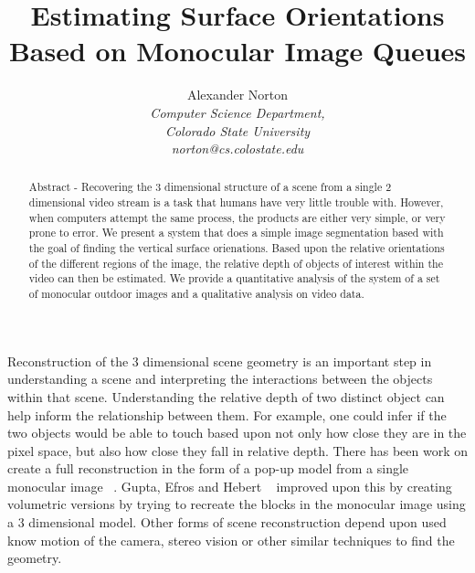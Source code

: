 \documentclass[times,10pt,twocolumn]{article}
\begin{document}
\title{Estimating Surface Orientations Based on Monocular Image Queues}

\author{Alexander Norton\\
\emph{Computer Science Department,}\\
\emph{Colorado State University}\\
\emph{norton@cs.colostate.edu}\\
}

\maketitle
\thispagestyle{empty}

\begin{abstract}
Abstract - Recovering the 3 dimensional structure of a scene from a single 2
dimensional video stream is a task that humans have very little trouble with.
However, when computers attempt the same process, the products are either very
simple, or very prone to error. We present a system that does a simple image
segmentation based with the goal of finding the vertical surface orienations.
Based upon the relative orientations of the different regions of the image, the
relative depth of objects of interest within the video can then be estimated.
We provide a quantitative analysis of the system of a set of monocular outdoor
images and a qualitative analysis on video data.
\end{abstract}


Reconstruction of the 3 dimensional scene geometry is an important step in
understanding a scene and interpreting the interactions between the objects
within that scene. Understanding the relative depth of two distinct object can
help inform the relationship between them. For example, one could infer if the
two objects would be able to touch based upon not only how close they are in
the pixel space, but also how close they fall in relative depth. There has been
work on create a full reconstruction in the form of a pop-up model from a
single monocular image ~\cite{Hoiem-05, Hoiem-08, Sexana}. Gupta, Efros and
Hebert ~\cite{Gupta} improved upon this by creating volumetric versions by
trying to recreate the blocks in the monocular image using a 3 dimensional
model. Other forms of scene reconstruction depend upon used know motion of the
camera, stereo vision or other similar techniques to find the geometry.
\end{document}
